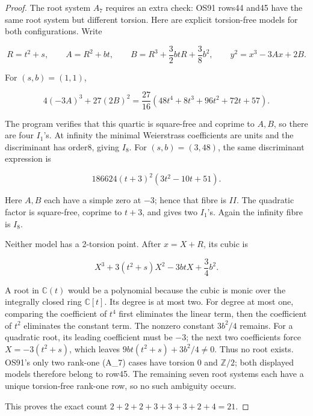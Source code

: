 \begin{proof}
The root system \(A_7\) requires an extra check: OS91 rows44 and45 have the same root system but different torsion. Here are explicit torsion-free models for both configurations. Write

\[
 R=t^2+s,\qquad A=R^2+bt,\qquad
 B=R^3+\frac32btR+\frac38b^2,
 \qquad y^2=x^3-3Ax+2B.
\]

For \((s,b)=(1,1)\),

\[
 4(-3A)^3+27(2B)^2
 =\frac{27}{16}(48t^4+8t^3+96t^2+72t+57).
\]

The program verifies that this quartic is square-free and coprime to \(A,B\), so there are four \(I_1\)'s. At infinity the minimal Weierstrass coefficients are units and the discriminant has order8, giving \(I_8\). For \((s,b)=(3,48)\), the same discriminant expression is

\[
 186624(t+3)^2(3t^2-10t+51).
\]

Here \(A,B\) each have a simple zero at \(-3\); hence that fibre is \(II\). The quadratic factor is square-free, coprime to \(t+3\), and gives two \(I_1\)'s. Again the infinity fibre is \(I_8\).

Neither model has a 2-torsion point. After \(x=X+R\), its cubic is

\[
 X^3+3(t^2+s)X^2-3btX+\frac34b^2.
\]

A root in \(\mathbb C(t)\) would be a polynomial because the cubic is monic over the integrally closed ring \(\mathbb C[t]\). Its degree is at most two. For degree at most one, comparing the coefficient of \(t^4\) first eliminates the linear term, then the coefficient of \(t^2\) eliminates the constant term. The nonzero constant \(3b^2/4\) remains. For a quadratic root, its leading coefficient must be \(-3\); the next two coefficients force \(X=-3(t^2+s)\), which leaves \(9bt(t^2+s)+3b^2/4\ne0\). Thus no root exists. OS91's only two rank-one (A\_7) cases have torsion 0 and \(\mathbb Z/2\); both displayed models therefore belong to row45. The remaining seven root systems each have a unique torsion-free rank-one row, so no such ambiguity occurs.

This proves the exact count \(2+2+2+3+3+3+2+4=21\).
\end{proof}
